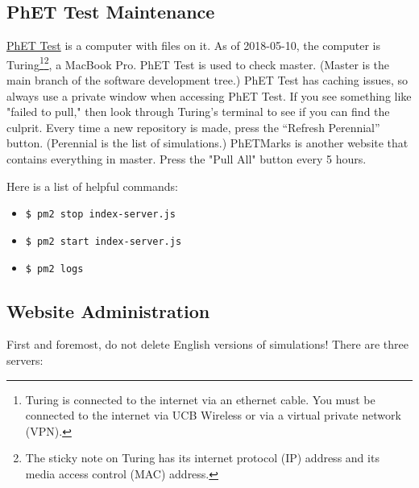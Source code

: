 \documentclass[titlepage]{article}
\begin{document}
	\subsection{PhET Test Maintenance}

\href{http://phettest.colorado.edu/}{PhET Test} is a computer with files on it. As of 2018-05-10, the computer is Turing\footnote{Turing is connected to the internet via an ethernet cable. You must be connected to the internet via UCB Wireless or via a virtual private network (VPN).}\footnote{The sticky note on Turing has its internet protocol (IP) address and its media access control (MAC) address.}, a MacBook Pro. PhET Test is used to check master. (Master is the main branch of the software development tree.) PhET Test has caching issues, so always use a private window when accessing PhET Test. If you see something like "failed to pull," then look through Turing's terminal to see if you can find the culprit. Every time a new repository is made, press the ``Refresh Perennial'' button. (Perennial is the list of simulations.) PhETMarks is another website that contains everything in master. Press the "Pull All" button every 5 hours.

Here is a list of helpful commands:

		\begin{itemize}
			\item \verb|$ pm2 stop index-server.js|
			\item \verb|$ pm2 start index-server.js|
			\item \verb|$ pm2 logs|
		\end{itemize}

	\subsection{Website Administration}\label{subsec:wa}
	
First and foremost, do not delete English versions of simulations! There are three servers:
\end{document}
